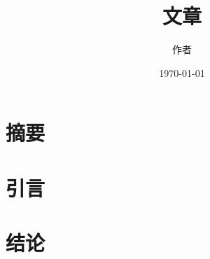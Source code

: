 \documentclass[11pt]{article}
\title{文章}
\author{作者}
\date{\today}
\begin{document}
\maketitle

\section{摘要}\label{sec:abstract}

\section{引言}\label{sec:introduction}

\section{结论}\label{sec:conclusion}
\end{document}
